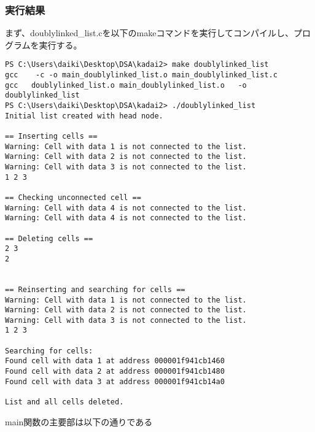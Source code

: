 \documentclass{ltjsarticle}
\begin{document}
\subsubsection{実行結果}\label{subsubsec:実行結果3}
まず、doublylinked\_list.cを以下のmakeコマンドを実行してコンパイルし、プログラムを実行する。
\begin{lstlisting}
PS C:\Users\daiki\Desktop\DSA\kadai2> make doublylinked_list
gcc    -c -o main_doublylinked_list.o main_doublylinked_list.c
gcc   doublylinked_list.o main_doublylinked_list.o   -o doublylinked_list
PS C:\Users\daiki\Desktop\DSA\kadai2> ./doublylinked_list   
Initial list created with head node.

== Inserting cells ==
Warning: Cell with data 1 is not connected to the list.
Warning: Cell with data 2 is not connected to the list.
Warning: Cell with data 3 is not connected to the list.
1 2 3

== Checking unconnected cell ==
Warning: Cell with data 4 is not connected to the list.
Warning: Cell with data 4 is not connected to the list.

== Deleting cells ==
2 3
2


== Reinserting and searching for cells ==
Warning: Cell with data 1 is not connected to the list.
Warning: Cell with data 2 is not connected to the list.
Warning: Cell with data 3 is not connected to the list.
1 2 3

Searching for cells:
Found cell with data 1 at address 000001f941cb1460
Found cell with data 2 at address 000001f941cb1480
Found cell with data 3 at address 000001f941cb14a0

List and all cells deleted.
\end{lstlisting}
main関数の主要部は以下の通りである
\end{document}
